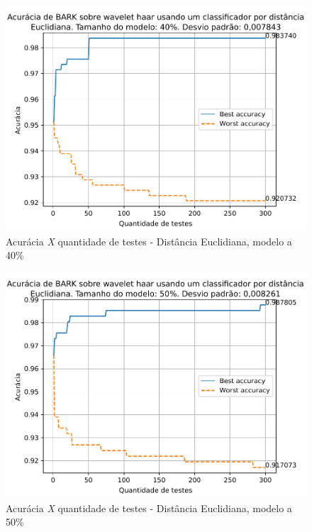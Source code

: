 		\newpage
		\begin{figure}
			\centering
			\includegraphics{images/results/confusionMatrices/classifier_Euclidian_40}
			\caption{Acurácia \textit{X} quantidade de testes - Distância Euclidiana, modelo a 40\%}
			\label{fig:classifiereuclidian40}
		\end{figure}
		
	
		\newpage
		\begin{figure}
			\centering
			\includegraphics{images/results/confusionMatrices/classifier_Euclidian_50}
			\caption{Acurácia \textit{X} quantidade de testes - Distância Euclidiana, modelo a 50\%}
			\label{fig:classifiereuclidian50}
		\end{figure}
		
	

